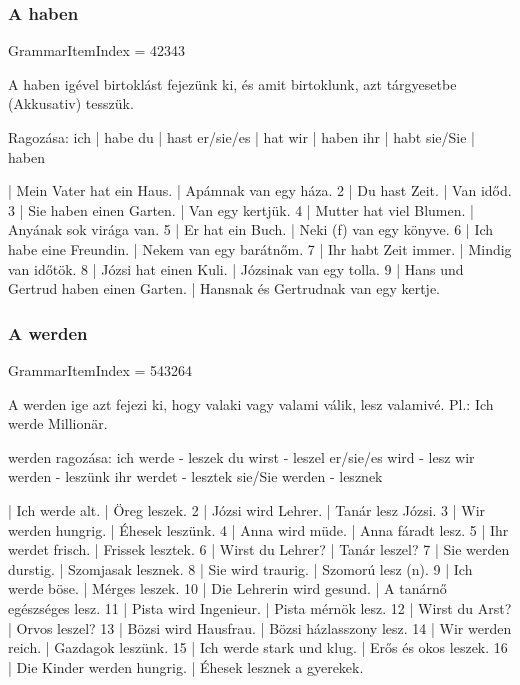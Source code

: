 \documentclass{article}
\newenvironment{desc}{\verbatim}{\endverbatim}
\newenvironment{exmp}{\verbatim}{\endverbatim}
\begin{document}
\begin{exmp}
\end{exmp}

\subsubsection{A haben}

GrammarItemIndex = 42343

\begin{desc}
A haben igével birtoklást fejezünk ki, és amit birtoklunk, azt tárgyesetbe (Akkusativ) tesszük.

Ragozása:
ich       | habe
du        | hast
er/sie/es | hat
wir       | haben
ihr       | habt
sie/Sie   | haben
\end{desc}

\begin{exmp}
1 | Mein Vater hat ein Haus. | Apámnak van egy háza.
2 | Du hast Zeit. | Van időd.
3 | Sie haben einen Garten. | Van egy kertjük.
4 | Mutter hat viel Blumen. | Anyának sok virága van.
5 | Er hat ein Buch. | Neki (f) van egy könyve.
6 | Ich habe eine Freundin. | Nekem van egy barátnőm.
7 | Ihr habt Zeit immer. | Mindig van időtök.
8 | Józsi hat einen Kuli. | Józsinak van egy tolla.
9 | Hans und Gertrud haben einen Garten. | Hansnak és Gertrudnak van egy kertje.
\end{exmp}

\subsubsection{A werden}

GrammarItemIndex = 543264

\begin{desc}
A werden ige azt fejezi ki, hogy valaki vagy valami válik, lesz
valamivé.
Pl.: Ich werde Millionär.

werden ragozása:
ich werde - leszek 
du wirst - leszel
er/sie/es wird - lesz
wir werden - leszünk
ihr werdet - lesztek
sie/Sie werden - lesznek
\end{desc}

\begin{exmp}
1 | Ich werde alt. | Öreg leszek.
2 | Józsi wird Lehrer. | Tanár lesz Józsi.
3 | Wir werden hungrig. | Éhesek leszünk.
4 | Anna wird müde. | Anna fáradt lesz.
5 | Ihr werdet frisch. | Frissek lesztek.
6 | Wirst du Lehrer? | Tanár leszel?
7 | Sie werden durstig. | Szomjasak lesznek.
8 | Sie wird traurig. | Szomorú lesz (n).
9 | Ich werde böse. | Mérges leszek.
10 | Die Lehrerin wird gesund. | A tanárnő egészséges lesz.
11 | Pista wird Ingenieur. | Pista mérnök lesz.
12 | Wirst du Arst? | Orvos leszel?
13 | Bözsi wird Hausfrau. | Bözsi házlasszony lesz.
14 | Wir werden reich. | Gazdagok leszünk.
15 | Ich werde stark und klug. | Erős és okos leszek.
16 | Die Kinder werden hungrig. | Éhesek lesznek a gyerekek.
\end{exmp}
\end{document}
